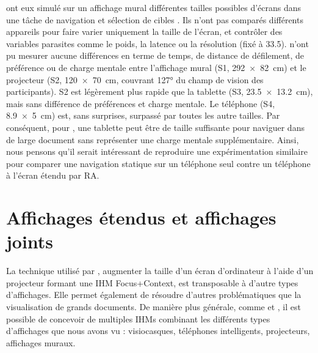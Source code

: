 
\cite{Raedle2014} ont eux simulé sur un affichage mural différentes tailles possibles d'écrans  dans une tâche de navigation et sélection de cibles . Ils n'ont pas comparés différents appareils pour faire varier uniquement la taille de l'écran, et contrôler des variables parasites comme le poids, la latence ou la résolution (fixé à \SI{33.5}{\ppi}). \citeauthor{Raedle2014} n'ont pu mesurer aucune différences en terme de temps, de distance de défilement, de préférence ou de charge mentale entre l'affichage mural (S1, \SI{292x82}{\cm}) et le projecteur (S2, \SI{120x70}{\cm}, couvrant \ang{127} du champ de vision des participants). S2 est légèrement plus rapide que la tablette (S3, \SI{23.5x13.2}{\cm}), mais sans différence de préférences et charge mentale. Le téléphone (S4, \SI{8.9x5}{\cm}) est, sans surprises, surpassé par toutes les autre tailles. Par conséquent, pour \citeauthor{Raedle2014}, une tablette peut être de taille suffisante pour naviguer dans de large document sans représenter une charge mentale supplémentaire. Ainsi, nous pensons qu'il serait intéressant de reproduire une expérimentation similaire pour comparer une navigation statique sur un téléphone seul contre un téléphone à l'écran étendu par RA.


\section{Affichages étendus et affichages joints}
\label{subsec:litterature_extended_screens}

La technique utilisé par \cite{Baudisch2002}, augmenter la taille d'un écran d'ordinateur à l'aide d'un projecteur formant une IHM Focus+Context, est transposable à d'autre types d'affichages. Elle permet également de résoudre d'autres problématiques que la visualisation de grands documents. De manière plus générale, comme \cite{Grubert2015} et \cite{Serrano2015}, il est possible de concevoir de multiples IHMs combinant les différents types d'affichages que nous avons vu : visiocasques, téléphones intelligents, projecteurs, affichages muraux.

